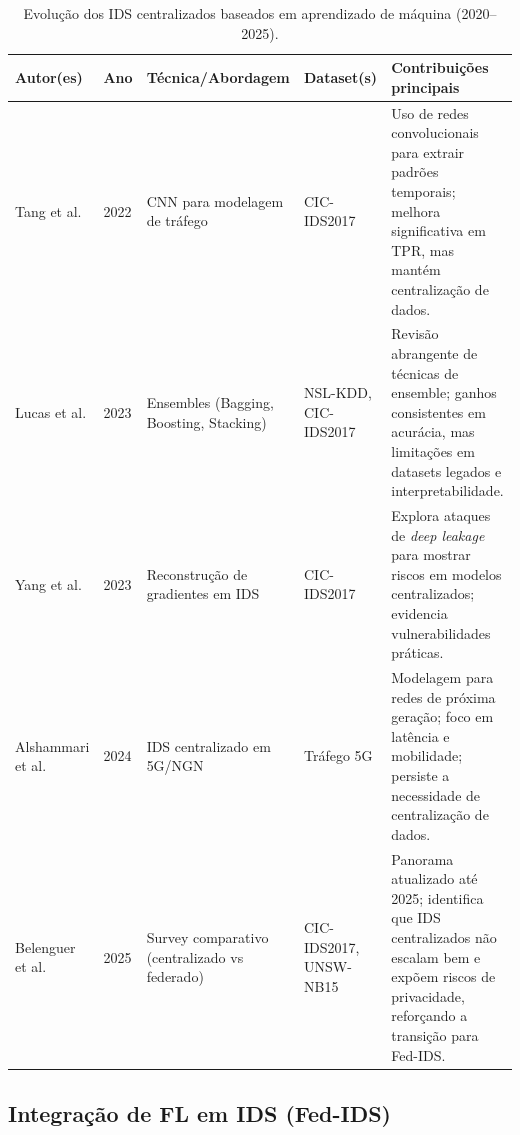 \documentclass[
	12pt,				%
	openright,			%
	oneside,			%
	a4paper,			%
	english,			%
	french,				%
	spanish,			%
	brazil,				%
	]{abntex2}
\begin{document}
\begin{table}[H]
\centering
\footnotesize
\caption{Evolução dos IDS centralizados baseados em aprendizado de máquina (2020–2025).}
\label{tab:ids_tradicionais_ano}
\begin{tabularx}{\linewidth}{@{}p{2.2cm}p{1.0cm}p{3.0cm}p{2.5cm}X@{}}
\toprule
\textbf{Autor(es)} & \textbf{Ano} & \textbf{Técnica/Abordagem} & \textbf{Dataset(s)} & \textbf{Contribuições principais} \\ 
\midrule
Tang et al. \cite{tang2022fedids} & 2022 & CNN para modelagem de tráfego & CIC-IDS2017 & Uso de redes convolucionais para extrair padrões temporais; melhora significativa em TPR, mas mantém centralização de dados. \\
\addlinespace
Lucas et al. \cite{lucas2023ensembleids} & 2023 & Ensembles (Bagging, Boosting, Stacking) & NSL-KDD, CIC-IDS2017 & Revisão abrangente de técnicas de ensemble; ganhos consistentes em acurácia, mas limitações em datasets legados e interpretabilidade. \\
\addlinespace
Yang et al. \cite{yang2023deepleakage} & 2023 & Reconstrução de gradientes em IDS & CIC-IDS2017 & Explora ataques de \textit{deep leakage} para mostrar riscos em modelos centralizados; evidencia vulnerabilidades práticas. \\
\addlinespace
Alshammari et al. \cite{alshammari2024springerids} & 2024 & IDS centralizado em 5G/NGN & Tráfego 5G & Modelagem para redes de próxima geração; foco em latência e mobilidade; persiste a necessidade de centralização de dados. \\
\addlinespace
Belenguer et al. \cite{belenguer2025surveyfedids} & 2025 & Survey comparativo (centralizado vs federado) & CIC-IDS2017, UNSW-NB15 & Panorama atualizado até 2025; identifica que IDS centralizados não escalam bem e expõem riscos de privacidade, reforçando a transição para Fed-IDS. \\
\bottomrule
\end{tabularx}
\end{table}




\subsection{Integração de FL em IDS (Fed-IDS)}
\label{subsec:fed_ids}
\end{document}
